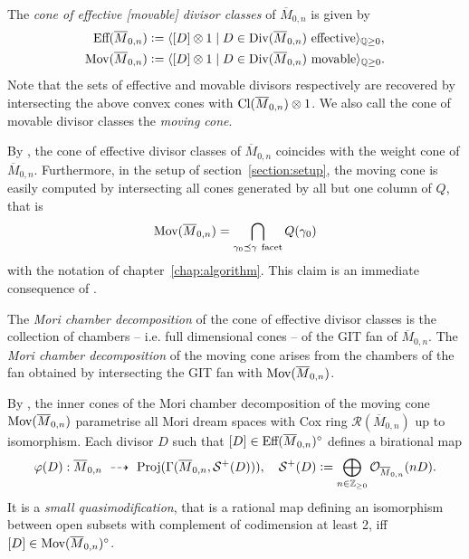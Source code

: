 \begin{defi}
	The \emph{cone of effective [movable] divisor classes} of $\overline{M}_{0,n}$ is given by
	\begin{align*}
		\text{Eff}(\overline{M}_{0,n}) &\mathrel{\mathop:}= \langle [D] \otimes 1 \mid D\in\text{Div}(\overline{M}_{0,n})\ \text{effective} \rangle_{\mathbb{Q}{\geq 0}}, \\
		\text{Mov}(\overline{M}_{0,n}) &\mathrel{\mathop:}= \langle [D] \otimes 1 \mid D\in\text{Div}(\overline{M}_{0,n})\ \text{movable} \rangle_{\mathbb{Q}{\geq 0}}.
	\end{align*}
	Note that the sets of effective and movable divisors respectively are recovered by intersecting the above convex cones with $\text{Cl}(\overline{M}_{0,n}) \otimes 1$. We also call the cone of movable divisor classes the \emph{moving cone}.
\end{defi}

\begin{remark}
	\label{remark:cone_of_divisor_classes_in_mn_context}
	By \cite[Proposition 3.3.2.1]{cox_rings}, the cone of effective divisor classes of $\overline{M}_{0,n}$ coincides with the weight cone of $\overline{M}_{0,n}$. Furthermore, in the setup of section~\ref{section:setup}, the moving cone is easily computed by intersecting all cones generated by all but one column of $Q$, that is
	$$\text{Mov}(\overline{M}_{0,n}) = \bigcap_{\gamma_0 \preceq \gamma\ \mathrm{facet}} Q(\gamma_0)$$
	with the notation of chapter~\ref{chap:algorithm}. This claim is an immediate consequence of \cite[Proposition 3.3.2.3]{cox_rings}.
\end{remark}

\begin{defi}
	The \emph{Mori chamber decomposition} of the cone of effective divisor classes is the collection of chambers -- i.e. full dimensional cones -- of the GIT fan of $\overline{M}_{0,n}$. The \emph{Mori chamber decomposition} of the moving cone arises from the chambers of the fan obtained by intersecting the GIT fan with $\text{Mov}(\overline{M}_{0,n})$.
\end{defi}

By \cite[Remark 3.3.4.2]{cox_rings}, the inner cones of the Mori chamber decomposition of the moving cone  $\text{Mov}(\overline{M}_{0,n})$ parametrise all Mori dream spaces with Cox ring $\mathcal{R}(\overline{M}_{0,n})$ up to isomorphism. Each divisor $D$ such that $[D]\in\text{Eff}(\overline{M}_{0,n})^\circ$ defines a birational map
$$\varphi(D): \overline{M}_{0,n}\ \dashrightarrow\ \text{Proj}(\Gamma(\overline{M}_{0,n}, \mathcal{S}^+(D))), \quad \mathcal{S}^+(D) \defeq \bigoplus_{n\in\integer_{\geq 0}} \O_{\overline{M}_{0,n}}(nD).$$
It is a \emph{small quasimodification}, that is a rational map defining an isomorphism between open subsets with complement of codimension at least 2, iff $[D]\in\text{Mov}(\overline{M}_{0,n})^\circ$.

